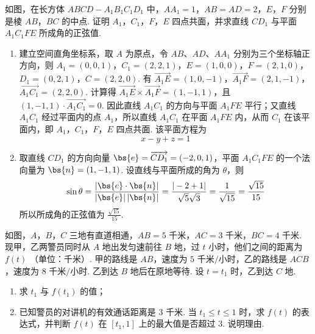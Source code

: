 \begin{problem}
如图，在长方体 \(ABCD - A_{1}B_{1}C_{1}D_{1}\) 中，\(AA_{1} = 1\)，\(AB = AD = 2\)，\(E\)，\(F\) 分别是棱 \(AB\)，\(BC\) 的中点. 证明 \(A_{1}\)，\(C_{1}\)，\(F\)，\(E\) 四点共面，并求直线 \(CD_{1}\) 与平面 \(A_{1}C_{1}FE\) 所成角的正弦值.

\end{problem}

\begin{solution}
\begin{enumerate}
\item 建立空间直角坐标系，取 \(A\) 为原点，令 \(AB\)、\(AD\)、\(AA_1\) 分别为三个坐标轴正方向，则 \(A_1=(0,0,1)\)，\(C_1=(2,2,1)\)，\(E=(1,0,0)\)，\(F=(2,1,0)\)，\(D_1=(0,2,1)\)，\(C=(2,2,0)\). 有 \(\overrightarrow{A_1E}=(1,0,-1)\)，\(\overrightarrow{A_1F}=(2,1,-1)\)，\(\overrightarrow{A_1C_1}=(2,2,0)\). 计算得 \(\overrightarrow{A_1E}\times\overrightarrow{A_1F}=(1,-1,1)\)，且 \((1,-1,1)\cdot\overrightarrow{A_1C_1}=0\). 因此直线 \(A_1C_1\) 的方向与平面 \(A_1FE\) 平行；又直线 \(A_1C_1\) 经过平面内的点 \(A_1\)，所以直线 \(A_1C_1\) 在平面 \(A_1FE\) 内，从而 \(C_1\) 在该平面内，即 \(A_1\)，\(C_1\)，\(F\)，\(E\) 四点共面. 该平面方程为
\[
x-y+z=1
\]

\item 取直线 \(CD_1\) 的方向向量 \(\bs{e}=\overrightarrow{CD_1}=(-2,0,1)\)，平面 \(A_1C_1FE\) 的一个法向量为 \(\bs{n}=(1,-1,1)\). 设直线与平面所成的角为 \(\theta\)，则
\[
\sin\theta=\frac{|\bs{e}\cdot\bs{n}|}{|\bs{e}|\,|\bs{n}|}=\frac{|-2+1|}{\sqrt5\sqrt3}=\frac{1}{\sqrt{15}}=\frac{\sqrt{15}}{15}
\]
所以所成角的正弦值为 \(\frac{\sqrt{15}}{15}\).
\end{enumerate}
\end{solution}

\begin{problem}
如图，\(A\)，\(B\)，\(C\) 三地有直道相通，\(AB = 5\text{ 千米}\)，\(AC = 3\text{ 千米}\)，\(BC = 4\text{ 千米}\). 现甲，乙两警员同时从 \(A\) 地出发匀速前往 \(B\) 地，过 \(t\text{ 小时}\)，他们之间的距离为 \(f(t)\) （单位：千米）. 甲的路线是 \(AB\)，速度为 \(5\text{ 千米/小时}\)，乙的路线是 \(ACB\)，速度为 \(8\text{ 千米/小时}\). 乙到达 \(B\) 地后在原地等待. 设 \(t = t_1\) 时，乙到达 \(C\) 地.
\begin{enumerate}
\item 求 \( t_{1} \) 与 \( f(t_{1}) \) 的值；
\item 已知警员的对讲机的有效通话距离是 \(3\text{ 千米}\). 当 \( t_{1} \leqslant t \leqslant 1 \) 时，求 \( f(t) \) 的表达式，并判断 \( f(t) \) 在 \( [t_{1}, 1] \) 上的最大值是否超过 \(3\). 说明理由.
\end{enumerate}

\end{problem}

